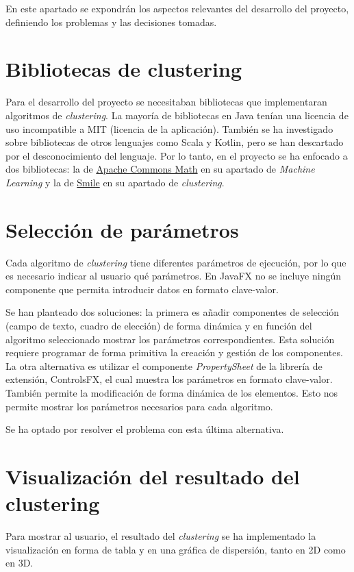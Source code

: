 En este apartado se expondrán los aspectos relevantes del desarrollo del proyecto, definiendo los problemas y las decisiones tomadas.

\section{Bibliotecas de clustering}
Para el desarrollo del proyecto se necesitaban bibliotecas que implementaran algoritmos de \emph{clustering}. La mayoría de bibliotecas en Java tenían una licencia de uso incompatible a MIT (licencia de la aplicación). También se ha investigado sobre bibliotecas de otros lenguajes como Scala y Kotlin, pero se han descartado por el desconocimiento del lenguaje. Por lo tanto, en el proyecto se ha enfocado a dos bibliotecas: la de \href{http://commons.apache.org/proper/commons-math/userguide/ml.html}{Apache Commons Math} en su apartado de \emph{Machine Learning} y la de \href{https://haifengl.github.io/clustering.html}{Smile} en su apartado de \emph{clustering}.

\section{Selección de parámetros}
Cada algoritmo de \emph{clustering} tiene diferentes parámetros de ejecución, por lo que es necesario indicar al usuario qué parámetros. En JavaFX no se incluye ningún componente que permita introducir datos en formato clave-valor. 

Se han planteado dos soluciones: la primera es añadir componentes de selección (campo de texto, cuadro de elección) de forma dinámica y en función del algoritmo seleccionado mostrar los parámetros correspondientes. Esta solución requiere programar de forma primitiva la creación y gestión de los componentes.
La otra alternativa es utilizar el componente \emph{PropertySheet} de la librería de extensión, ControlsFX, el cual muestra los parámetros en formato clave-valor. También permite la modificación de forma dinámica de los elementos. Esto nos permite mostrar los parámetros necesarios para cada algoritmo.


Se ha optado por resolver el problema con esta última alternativa.

\section{Visualización del resultado del clustering}
Para mostrar al usuario, el resultado del \emph{clustering} se ha implementado la visualización en forma de tabla y en una gráfica de dispersión, tanto en 2D como en 3D.

